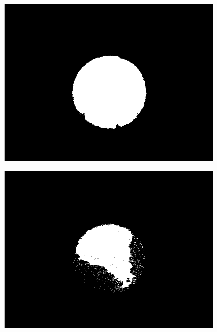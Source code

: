 \documentclass[12pt,a4paper]{report}
\begin{document}
\begin{figure}[!htbp]
\begin{minipage}{0.48\linewidth}
        \centering
        \includegraphics[width=\linewidth]{ptile.png}
        \label{fig:ptile}
    \end{minipage} \hfill
    \begin{minipage}{0.48\linewidth}
        \centering
        \includegraphics[width=\linewidth]{moment.png}
        \label{fig:moment}
    \end{minipage} \\
    \begin{minipage}{0.48\linewidth}
        \centering

\end{minipage}
\end{figure}
\end{document}
